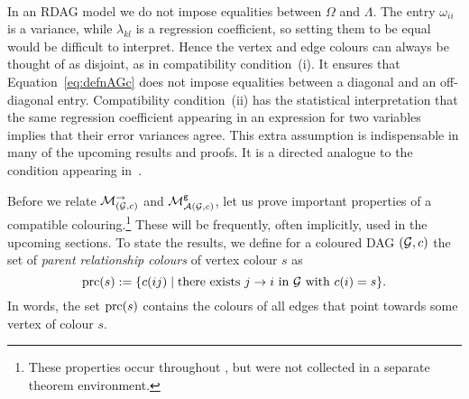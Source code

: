 \begin{remark}
	\ \\
	In an RDAG model we do not impose equalities between $\Omega$ and $\Lambda$.
	The entry $\omega_{ii}$ is a variance, while $\lambda_{kl}$ is a regression coefficient, so setting them to be equal would be difficult to interpret.
	Hence the vertex and edge colours can always be thought of as disjoint, 
	as in compatibility condition~(i). It ensures that Equation~\eqref{eq:defnAGc} does not impose equalities between a diagonal and an off-diagonal entry.
	Compatibility condition~(ii) has the statistical interpretation that the same regression coefficient appearing in an expression for two variables implies that their error variances agree.
	This extra assumption is indispensable in many of the upcoming results and proofs.
	It is a directed analogue to the condition appearing in~\cite[Proposition~1]{hojsgaard2008graphical}.
	\hfill\remSymbol
\end{remark}

Before we relate $\mathcal{M}_{(\mathcal{G}, c)}^{\to}$ and $\mathcal{M}^{\mathtt{g}}_{\mathcal{A}(\mathcal{G}, c)}$, let us prove important properties of a compatible colouring.\footnote{These properties occur throughout \cite{RDAG}, but were not collected in a separate theorem environment.}
These will be frequently, often implicitly, used in the upcoming sections.
To state the results, we define for a coloured DAG $(\mathcal{G}, c)$ the set of \emph{parent relationship colours} of vertex colour $s$ as 
\begin{equation}\label{eq:defnPRCs}
	\operatorname{prc}(s) := \{c(ij) \mid \text{there exists } j \to i \text{ in } \mathcal{G} \text{ with } c(i) = s\}.
\end{equation}
In words, the set $\operatorname{prc}(s)$ contains the colours of all edges that point towards some vertex of colour $s$.

